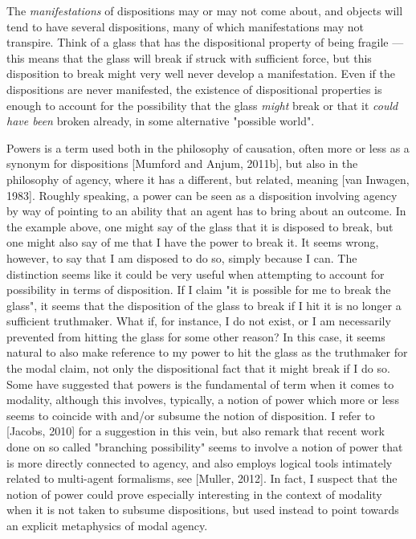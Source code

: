 \documentclass{article}
\begin{document}
The \emph{manifestations} of dispositions may or may not come about, and objects will tend to have several dispositions, many of which manifestations may not transpire. Think of a glass that has the dispositional property of being fragile --- this means that the glass will break if struck with sufficient force, but this disposition to break might very well never develop a manifestation. Even if the dispositions are never manifested, the existence of dispositional properties is enough to account for the possibility that the glass \emph{might} break or that it \emph{could have been} broken already, in some alternative "possible world".

Powers is a term used both in the philosophy of causation, often more or less as a
synonym for dispositions [Mumford and Anjum, 2011b], but also in the philosophy of
agency, where it has a different, but related, meaning [van Inwagen, 1983]. Roughly
speaking, a power can be seen as a disposition involving agency by way of pointing to
an ability that an agent has to bring about an outcome. In the example above, one
might say of the glass that it is disposed to break, but one might also say of me that
I have the power to break it. It seems wrong, however, to say that I am disposed to
do so, simply because I can.
The distinction seems like it could be very useful when attempting to account for
possibility in terms of disposition. If I claim "it is possible for me to break the glass",
it seems that the disposition of the glass to break if I hit it is no longer a sufficient
truthmaker. What if, for instance, I do not exist, or I am necessarily prevented from
hitting the glass for some other reason? In this case, it seems natural to also make
reference to my power to hit the glass as the truthmaker for the modal claim, not only the dispositional fact that it might break if I do so. Some have suggested that
powers is the fundamental of term when it comes to modality, although this involves,
typically, a notion of power which more or less seems to coincide with and/or subsume
the notion of disposition. I refer to [Jacobs, 2010] for a suggestion in this vein, but also
remark that recent work done on so called "branching possibility" seems to involve a
notion of power that is more directly connected to agency, and also employs logical
tools intimately related to multi-agent formalisms, see [Muller, 2012].
In fact, I suspect that the notion of power could prove especially interesting in the
context of modality when it is not taken to subsume dispositions, but used instead
to point towards an explicit metaphysics of modal agency.
\end{document}

